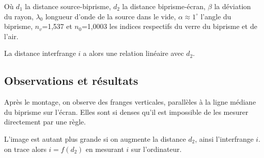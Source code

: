 \documentclass[11pt, a4paper]{article}
\begin{document}
Où $d_1$ la distance source-biprisme, $d_2$ la distance biprisme-écran, $\beta$ la déviation du rayon, $\lambda_0$ longueur d'onde de la source dans le vide, $\alpha\approx1^{\circ}$ l'angle du biprisme, $n_v$=1,537 et $n_0$=1,0003 les indices respectifs du verre du biprisme et de l'air.

La distance interfrange $i$ a alors une relation linéaire avec $d_2$.
\subsection{Observations et résultats}
Après le montage, on observe des franges verticales, parallèles à la ligne médiane du biprisme sur l'écran. Elles sont si denses qu'il est impossible de les mesurer directement par une règle.

L'image est autant plus grande si on augmente la distance $d_2$, ainsi l'interfrange $i$. on trace alors $i=f(d_2)$ en mesurant $i$ sur l'ordinateur.
\end{document}
